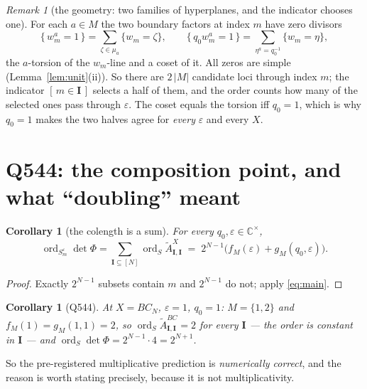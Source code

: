 \documentclass[11pt]{article}
\newtheorem{cor}[thm]{Corollary}
\theoremstyle{definition}
\theoremstyle{remark}
\newtheorem{rem}[thm]{Remark}
\DeclareMathOperator{\ord}{ord}
\newcommand{\At}{\widetilde{A}}
\newcommand{\bI}{\mathbf{I}}
\begin{document}
\begin{rem}[the geometry: two families of hyperplanes, and the indicator chooses one]
For each $a\in M$ the two boundary factors at index $m$ have zero divisors
\[
  \{\,w_m^{a}=1\,\}=\textstyle\sum_{\zeta\in\mu_a}\{w_m=\zeta\},
  \qquad
  \{\,q_0w_m^{a}=1\,\}=\textstyle\sum_{\eta^{a}=q_0^{-1}}\{w_m=\eta\},
\]
the $a$-torsion of the $w_m$-line and a coset of it.  All zeros are simple
(Lemma~\ref{lem:unit}(ii)).  So there are $2\,|M|$ candidate loci through index $m$; the
indicator $[\,m\in\bI\,]$ selects a half of them, and the order counts how many of the
selected ones pass through $\varepsilon$.  The coset equals the torsion iff $q_0=1$, which
is why $q_0=1$ makes the two halves agree for \emph{every} $\varepsilon$ and every $X$.
\end{rem}

\section{Q544: the composition point, and what ``doubling'' meant}

\begin{cor}[the colength is a sum]\label{cor:colength}
For every $q_0,\varepsilon\in\mathbb{C}^{\times}$,
\[
  \ord_{S^{\varepsilon}_m}\det\Phi=\sum_{\bI\subseteq[N]}\ord_S\At^{X}_{\bI,\bI}
  \;=\;2^{N-1}\bigl(f_M(\varepsilon)+g_M(q_0,\varepsilon)\bigr).
\]
\end{cor}
\begin{proof}
Exactly $2^{N-1}$ subsets contain $m$ and $2^{N-1}$ do not; apply \eqref{eq:main}.
\end{proof}

\begin{cor}[Q544]\label{cor:q544}
At $X=BC_N$, $\varepsilon=1$, $q_0=1$: $M=\{1,2\}$ and $f_M(1)=g_M(1,1)=2$, so
$\ord_S\At^{BC}_{\bI,\bI}=2$ for \emph{every} $\bI$ --- the order is constant in $\bI$ ---
and $\ord_S\det\Phi=2^{N-1}\cdot4=2^{N+1}$.
\end{cor}

So the pre-registered multiplicative prediction is \emph{numerically correct}, and the
reason is worth stating precisely, because it is not multiplicativity.
\end{document}
